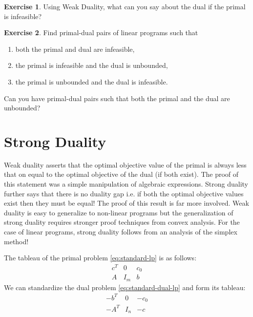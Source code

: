 \documentclass[
]{book}
\providecommand{\tightlist}{%
  \setlength{\itemsep}{0pt}\setlength{\parskip}{0pt}}
\theoremstyle{definition}
\theoremstyle{definition}
\theoremstyle{definition}
\newtheorem{exercise}{Exercise}[chapter]
\theoremstyle{definition}
\theoremstyle{remark}
\begin{document}
\begin{exercise}
Using Weak Duality, what can you say about the dual if the primal is infeasible?
\end{exercise}

\begin{exercise}
Find primal-dual pairs of linear programs such that

\begin{enumerate}
\def\labelenumi{\arabic{enumi}.}
\tightlist
\item
  both the primal and dual are infeasible,
\item
  the primal is infeasible and the dual is unbounded,
\item
  the primal is unbounded and the dual is infeasible.
\end{enumerate}

Can you have primal-dual pairs such that both the primal and the dual are unbounded?
\end{exercise}

\hypertarget{strong-duality}{%
\section{Strong Duality}\label{strong-duality}}

Weak duality asserts that the optimal objective value of the primal is always less that on equal to
the optimal objective of the dual (if both exist). The proof of this statement was a simple
manipulation of algebraic expressions. Strong duality further says that there is no duality gap i.e.
if both the optimal objective values exist then they must be equal! The proof of this result is far
more involved. Weak duality is easy to generalize to non-linear programs but the generalization of
strong duality requires stronger proof techniques from convex analysis. For the case of linear
programs, strong duality follows from an analysis of the simplex method!

The tableau of the primal problem \eqref{eq:standard-lp} is as follows:
\begin{equation} 
  \begin{array}{ll|r}
  c^T & 0 & c_0 \\ \hline
  A & I_m & b 
  \end{array}
  \label{eq:tableau-primal}
\end{equation}
We can standardize the dual problem \eqref{eq:standard-dual-lp} and form its tableau:
\begin{equation} 
  \begin{array}{ll|r}
  -b^T & 0 & -c_0 \\ \hline
  -A^T & I_n & -c 
  \end{array}
  \label{eq:tableau-dual}
\end{equation}
\end{document}
